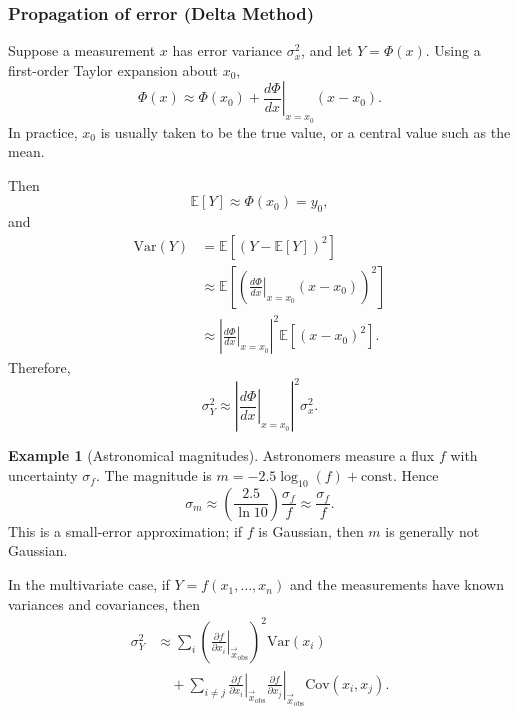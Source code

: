 \documentclass[11pt, titlepage]{article} %
\numberwithin{equation}{section}
\theoremstyle{definition}
\newtheorem*{example*}{Example}
\numberwithin{assumption}{section}
\begin{document}
\subsubsection*{Propagation of error (Delta Method)}

Suppose a measurement $x$ has error variance $\sigma_x^2$, and let $Y=\Phi(x)$. Using a first-order Taylor expansion about $x_0$,
\begin{equation*}
    \Phi(x)\approx \Phi(x_0)+\left.\frac{d\Phi}{dx}\right|_{x=x_0}(x-x_0).
\end{equation*}
In practice, $x_0$ is usually taken to be the true value, or a central value such as the mean.

Then
\begin{equation*}
    \mathbb{E}[Y]\approx \Phi(x_0)=y_0,
\end{equation*}
and
\begin{align*}
    \mathrm{Var}(Y)
    &=\mathbb{E}\!\left[(Y-\mathbb{E}[Y])^2\right]\\
    &\approx
    \mathbb{E}\!\left[
    \left(
    \left.\frac{d\Phi}{dx}\right|_{x=x_0}(x-x_0)
    \right)^2
    \right]\\
    &\approx
    \left|
    \left.\frac{d\Phi}{dx}\right|_{x=x_0}
    \right|^2
    \mathbb{E}\!\left[(x-x_0)^2\right].
\end{align*}
Therefore,
\begin{equation*}
    \sigma_Y^2\approx
    \left|
    \left.\frac{d\Phi}{dx}\right|_{x=x_0}
    \right|^2 \sigma_x^2.
\end{equation*}

\begin{example*}[Astronomical magnitudes]
Astronomers measure a flux $f$ with uncertainty $\sigma_f$. The magnitude is $m=-2.5\log_{10}(f)+\mathrm{const.}$ Hence
\begin{equation*}
    \sigma_m\approx \left(\frac{2.5}{\ln 10}\right)\frac{\sigma_f}{f}\approx \frac{\sigma_f}{f}.
\end{equation*}
This is a small-error approximation; if $f$ is Gaussian, then $m$ is generally not Gaussian.
\end{example*}

In the multivariate case, if $Y=f(x_1,\dots,x_n)$ and the measurements have known variances and covariances, then
\begin{align*}
    \sigma_Y^2
    &\approx
    \sum_i
    \left(
    \left.\frac{\partial f}{\partial x_i}\right|_{\vec x_{\mathrm{obs}}}
    \right)^2
    \mathrm{Var}(x_i)\\
    &\quad+
    \sum_{i\ne j}
    \left.\frac{\partial f}{\partial x_i}\right|_{\vec x_{\mathrm{obs}}}
    \left.\frac{\partial f}{\partial x_j}\right|_{\vec x_{\mathrm{obs}}}
    \mathrm{Cov}(x_i,x_j).
\end{align*}
\end{document}
